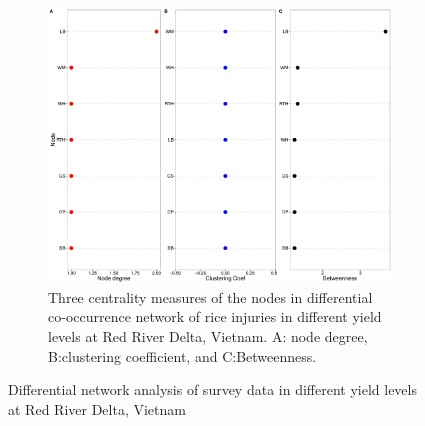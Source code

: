 \begin{figure}
\begin{subfigure}[b]{1\textwidth}
        \includegraphics[width = 1\textwidth]{figures/yield_dif_nodepropRed_River_Delta.pdf}
        \caption[Three centrality measures of the nodes in differential co-occurrence network of rice injuries in different yield levels at Red River Delta, Vietnam]{Three centrality measures of the nodes in differential co-occurrence network of rice injuries in different yield levels at Red River Delta, Vietnam. A: node degree, B:clustering coefficient, and C:Betweenness.}
        \label{fig:nodepropdifyield_RR}
    \end{subfigure}
    \caption{Differential network analysis of survey data in different yield levels at Red River Delta, Vietnam}
    \label{fig:difyield_RR}
\end{figure}
 
